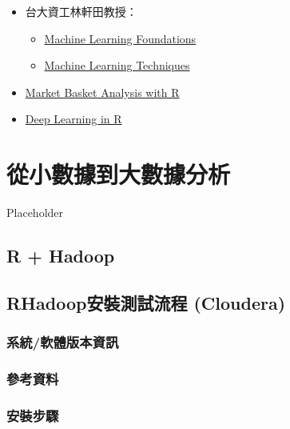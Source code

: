 \documentclass[]{book}
\providecommand{\tightlist}{%
  \setlength{\itemsep}{0pt}\setlength{\parskip}{0pt}}
\begin{document}
\begin{itemize}
\item
  台大資工林軒田教授：

  \begin{itemize}
  \tightlist
  \item
    \href{www.coursera.org/course/ntumlone}{Machine Learning Foundations}
  \item
    \href{www.coursera.org/course/ntumltwo}{Machine Learning Techniques}
  \end{itemize}
\item
  \href{http://www.salemmarafi.com/code/market-basket-analysis-with-r/}{Market Basket Analysis with R}
\item
  \href{https://www.r-bloggers.com/deep-learning-in-r-2/}{Deep Learning in R}
\end{itemize}

\hypertarget{big}{%
\chapter{從小數據到大數據分析}\label{big}}

Placeholder

\hypertarget{r-hadoop}{%
\section{R + Hadoop}\label{r-hadoop}}

\hypertarget{rhadoopux5b89ux88ddux6e2cux8a66ux6d41ux7a0b-cloudera}{%
\section{RHadoop安裝測試流程 (Cloudera)}\label{rhadoopux5b89ux88ddux6e2cux8a66ux6d41ux7a0b-cloudera}}

\hypertarget{ux7cfbux7d71ux8edfux9ad4ux7248ux672cux8cc7ux8a0a}{%
\subsection{系統/軟體版本資訊}\label{ux7cfbux7d71ux8edfux9ad4ux7248ux672cux8cc7ux8a0a}}

\hypertarget{ux53c3ux8003ux8cc7ux6599-2}{%
\subsection{參考資料}\label{ux53c3ux8003ux8cc7ux6599-2}}

\hypertarget{ux5b89ux88ddux6b65ux9a5f}{%
\subsection{安裝步驟}\label{ux5b89ux88ddux6b65ux9a5f}}
\end{document}
